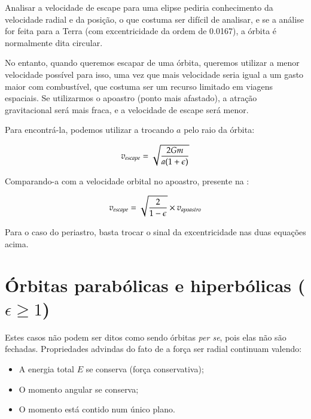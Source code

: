 Analisar a velocidade de escape para uma elipse pediria conhecimento da velocidade radial e da posição, o que costuma ser difícil de analisar, e se a análise for feita para a Terra (com excentricidade da ordem de 0.0167), a órbita é normalmente dita circular. {\\}

No entanto, quando queremos escapar de uma órbita, queremos utilizar a menor velocidade possível para isso, uma vez que mais velocidade seria igual a um gasto maior com combustível, que costuma ser um recurso limitado em viagens espaciais. Se utilizarmos o apoastro (ponto mais afastado), a atração gravitacional será mais fraca, e a velocidade de escape será menor.{\\}

Para encontrá-la, podemos utilizar a  trocando $a$ pelo raio da órbita:

\begin{equation}
	v_{escape} = \sqrt{\frac{2Gm}{a(1+\epsilon)}}						\label{eq82}
\end{equation}

Comparando-a com a velocidade orbital no apoastro, presente na :

\begin{equation}
	v_{escape} = \sqrt{\frac{2}{1-\epsilon}} \times v_{apoastro}		\label{eq83}
\end{equation}

Para o caso do periastro, basta trocar o sinal da excentricidade nas duas equações acima.

\newpage

\section{Órbitas parabólicas e hiperbólicas ($\epsilon \geq 1$)}

Estes casos não podem ser ditos como sendo órbitas \textit{per se}, pois elas não são fechadas. Propriedades advindas do fato de a força ser radial continuam valendo:

\begin{itemize}
	\item A energia total $E$ se conserva (força conservativa);
	\item O momento angular se conserva;
	\item O momento está contido num único plano.
\end{itemize}


